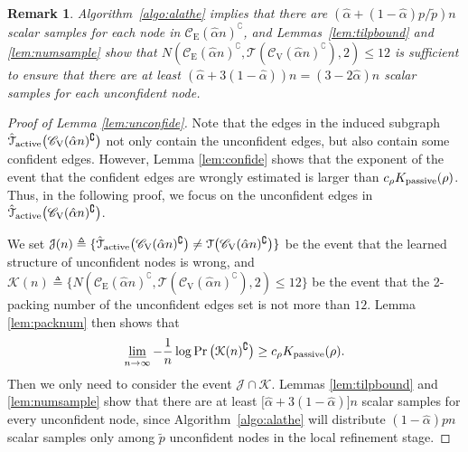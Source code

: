 \documentclass[11pt,onecolumn]{article}
\newcommand{\calJ}{\mathcal{J}}
\newcommand{\calK}{\mathcal{K}}
\newcommand{\calT}{\mathcal{T}}
\newcommand{\hatcalT}{\hat{\calT}}
\newcommand{\scC}{\mathscr{C}}
\newcommand{\tilp}{\tilde{p}}
\newcommand{\halpha}{\hat{\alpha}}
\newtheorem{remark}{Remark}
\newcommand{\Passive}{{\rm passive}}
\newcommand{\Active}{{\rm active}}
\begin{document}
\begin{remark}
	 Algorithm~\ref{algo:alathe} implies that there are $(\halpha+(1-\halpha)p/\tilp)n$ scalar samples for each node in $\scC_{\mathrm{E}}(\halpha n)^{\complement}$, and Lemmas~\ref{lem:tilpbound} and \ref{lem:numsample} show that $N(\scC_{\mathrm{E}}(\halpha n)^{\complement},\calT(\scC_{\mathrm{V}}(\halpha n)^{\complement}),2)\leq 12$ is sufficient to ensure that there are at least $(\halpha+3(1-\halpha))n=(3-2\halpha)n$ scalar samples for each unconfident node.
\end{remark}
\begin{proof}[Proof of Lemma \ref{lem:unconfide}]
	Note that the edges in the induced subgraph $\hatcalT_{\Active}\big(\scC_{\mathrm{V}}(\halpha n)^{\complement}\big)$ not only contain the unconfident edges, but also contain some confident edges. However, Lemma \ref{lem:confide} shows that the exponent of the event that the confident edges are wrongly estimated is larger than $c_{\rho}K _{\Passive}(\rho)$. Thus, in the following proof, we focus on the unconfident edges in $\hatcalT_{\Active}\big(\scC_{\mathrm{V}}(\halpha n)^{\complement}\big)$.
	
	We set $\calJ(n)\triangleq\{\hatcalT_{\Active}\big(\scC_{\mathrm{V}}(\halpha n)^{\complement}\big)\neq \calT\big(\scC_{\mathrm{V}}(\halpha n)^{\complement}\big)\}$ be the event that the learned structure of unconfident nodes is wrong, and $\calK(n)\triangleq\{N(\scC_{\mathrm{E}}(\halpha n)^{\complement},\calT(\scC_{\mathrm{V}}(\halpha n)^{\complement}),2)\leq 12\}$ be 
	the event that the 2-packing number of the unconfident edges set is not more than  $12$. Lemma \ref{lem:packnum} then shows that 
	\begin{align}
		\varliminf_{n\rightarrow\infty}-\frac{1}{n}\log\Pr\big(\calK(n)^{\complement}\big)\geq c_{\rho}K _{\Passive}(\rho).
	\end{align}
	Then we only need to consider the event $\calJ\cap \calK$. Lemmas \ref{lem:tilpbound} and \ref{lem:numsample} show that there are at least $\big[\halpha+3(1-\halpha)\big]n$ scalar samples for every unconfident node, since Algorithm~\ref{algo:alathe} will distribute $(1-\halpha)pn$ scalar samples only among $\tilp$ unconfident nodes in the local refinement stage. 


\end{proof}
\end{document}
